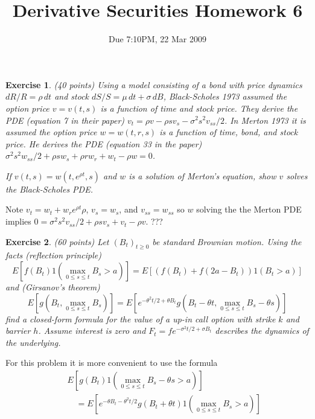 \documentclass[11pt,fleqn]{amsproc}
\newtheorem{xca}{Exercise}
\begin{document}
\title{Derivative Securities Homework 6}
\author{Due 7:10PM, 22 Mar 2009}

\maketitle

\begin{xca}{(40 points)}
Using a model consisting of a bond with price dynamics $dR/R = \rho\,dt$
and stock $dS/S = \mu\,dt + \sigma\,dB$, Black-Scholes 1973 assumed
the option price $v = v(t, s)$ is a function of time and stock price.
They derive the PDE (equation 7 in their paper) $v_t = \rho v - \rho
sv_s - \sigma^2 s^2 v_{ss}/2$. In Merton 1973 it is assumed the option
price $w = w(t, r, s)$ is a function of time, bond, and stock price. He
derives the PDE (equation 33 in the paper) $\sigma^2 s^2 w_{ss}/2 +
\rho sw_s + \rho r w_r + w_t - \rho w = 0$.

If $v(t, s) = w(t, e^{\rho t}, s)$ and $w$ is a solution of
Merton's equation, show $v$ solves the Black-Scholes PDE.
\end{xca}

Note $v_t = w_t + w_r e^{\rho t} \rho$,
$v_s = w_s$, and $v_{ss} = w_{ss}$ so $w$ solving the the Merton PDE
implies $0 = \sigma^2 s^2 v_{ss}/2 + \rho s v_s + v_t - \rho v$.
???

\begin{xca}{(60 points)}
Let $(B_t)_{t\ge0}$ be standard Brownian motion. Using the
facts (reflection principle)
\begin{equation*}
E[f(B_t)1(\max_{0\le s\le t}B_s > a)]
= E[(f(B_t) + f(2a - B_t))1(B_t > a)]
\end{equation*}
and (Girsanov's theorem)
\begin{equation*}
E[g(B_t, \max_{0\le s\le t}B_s)]
= E[e^{-\theta^2 t/2 + \theta B_t}
g(B_t - \theta t, \max_{0\le s\le t}B_s - \theta s)]
\end{equation*}
find a closed-form formula for the value of a up-in call option
with strike $k$ and barrier $h$.
Assume interest is zero and
$F_t = fe^{-\sigma^2 t/2 + \sigma B_t}$ describes the
dynamics of the underlying.
\end{xca}

For this problem it is more convenient to use the formula
\begin{eqnarray*}
&&E[g(B_t) 1(\max_{0\le s\le t}B_s - \theta s > a)]\\
&&\quad = E[e^{-\theta B_t - \theta^2 t/2}
g(B_t + \theta t) 1(\max_{0\le s\le t}B_s > a)]
\end{eqnarray*}
\end{document}
